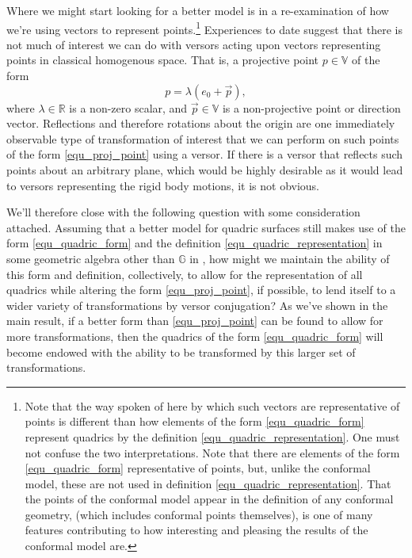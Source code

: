 \documentclass{birkjour}
\theoremstyle{definition}
\theoremstyle{remark}
\numberwithin{equation}{section}
\newcommand{\G}{\mathbb{G}}
\newcommand{\V}{\mathbb{V}}
\newcommand{\R}{\mathbb{R}}
\begin{document}
Where we might start looking for a better model is in a re-examination of how we're using
vectors to represent points.\footnote{Note that the way spoken of here by which such vectors are
representative of points is different than how elements of the form \eqref{equ_quadric_form}
represent quadrics by the definition \eqref{equ_quadric_representation}.  One must not
confuse the two interpretations.  Note that there are elements of the form \eqref{equ_quadric_form}
representative of points, but, unlike the conformal model, these are not used in definition
\eqref{equ_quadric_representation}.  That the points of the conformal model appear
in the definition of any conformal geometry, (which includes conformal points themselves), is one of many
features contributing to how interesting and pleasing the results of the conformal model are.}
Experiences to date suggest that there is not much of interest we can do with versors acting
upon vectors representing points in classical homogenous space.  That is, a projective point $p\in\V$
of the form
\begin{equation}\label{equ_proj_point}
p = \lambda(e_0 + \vec{p}),
\end{equation}
where $\lambda\in\R$ is a non-zero scalar, and $\vec{p}\in\V$ is a non-projective point or direction vector.  Reflections and therefore rotations
about the origin are one immediately observable type of transformation of interest
that we can perform on such points of the form \eqref{equ_proj_point} using a versor.
If there is a versor that reflects such points about
an arbitrary plane, which would be highly desirable as it would lead to versors
representing the rigid body motions, it is not obvious.

We'll therefore close with the following question with some consideration attached.
Assuming that a better model for quadric surfaces still makes use of the form \eqref{equ_quadric_form} and
the definition \eqref{equ_quadric_representation} in some geometric algebra other than $\G$
in \cite{Parkin12}, how might we maintain the ability of this form and definition, collectively,
to allow for the representation of all quadrics while altering the form \eqref{equ_proj_point},
if possible, to lend itself to a wider variety of transformations by versor conjugation?  As we've
shown in the main result, if a better form than \eqref{equ_proj_point} can be found to
allow for more transformations, then
the quadrics of the form \eqref{equ_quadric_form} will become endowed with the ability
to be transformed by this larger set of transformations.
\end{document}
